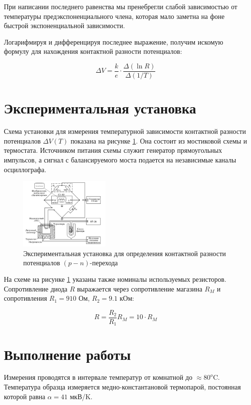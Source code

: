 \documentclass[12pt]{kiarticle}
\begin{document}
	При написании последнего равенства мы пренебрегли слабой зависимостью от температуры предэкспоненциального члена, которая
	мало заметна на фоне быстрой экспоненциальной зависимости.
	
	Логарифмируя и дифференцируя последнее выражение, получим искомую формулу для нахождения контактной разности потенциалов:
	
	\begin{equation}\label{dV}
	\Delta V = \frac{k}{e}\cdot \frac{\Delta(\ln R)}{\Delta(1/T)}
	\end{equation}
	
		\section{Экспериментальная установка}
	
	Схема установки для измерения температурной зависимости контактной разности потенциалов $\Delta V(T)$ показана на рисунке \ref{pic:scheme}. Она состоит из мостиковой схемы и термостата. Источником питания схемы служит генератор прямоугольных импульсов, а сигнал с балансируемого моста подается на независимые каналы осциллографа. 
	
		\begin{figure}[h]
		\centering	
		\includegraphics[width=0.4\textwidth]{scheme.png}
		\caption{Экспериментальная установка для определения контактной разности потенциалов $(p-n)$-перехода}
		\label{pic:scheme}
	\end{figure} 

	
	На схеме на рисунке \ref{pic:scheme} указаны также номиналы используемых резисторов. Сопротивление диода $R$ выражается через сопротивление магазина $R_M$ и сопротивления $R_1 = 910$ Ом, $R_2 = 9.1$ кОм:
	
	\[ R = \frac{R_2}{R_1}R_M = 10\cdot R_M \] 
	
	\section{Выполнение работы}
	
	Измерения проводятся в интервале температур от комнатной до $\approx 80^o$C. Температура образца измеряется медно-константановой термопарой, постоянная которой равна $\alpha = 41$ мкВ/K.
	
\end{document}
